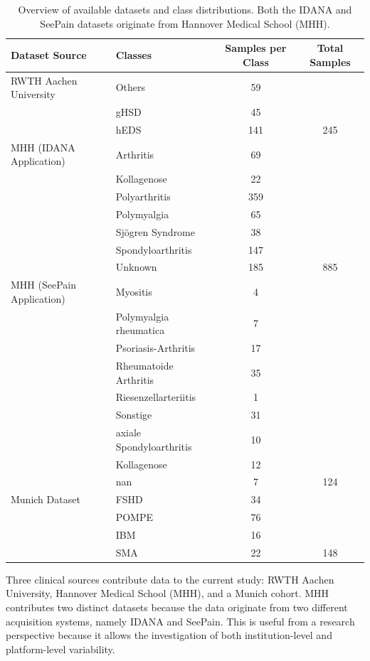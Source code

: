 \documentclass[12pt]{report}
\begin{document}
\begin{table}[h]
    \centering
    \begin{tabular}{|l|l|c|c|}
        \hline
        \textbf{Dataset Source} & \textbf{Classes} & \textbf{Samples per Class} & \textbf{Total Samples} \\
        \hline
        RWTH Aachen University & Others & 59 & \\
        & gHSD & 45 & \\
        & hEDS & 141 & 245 \\
        \hline
        MHH (IDANA Application) & Arthritis & 69 & \\
        & Kollagenose & 22 & \\
        & Polyarthritis & 359 & \\
        & Polymyalgia & 65 & \\
        & Sj\"ogren Syndrome & 38 & \\
        & Spondyloarthritis & 147 & \\
        & Unknown & 185 & 885 \\
        \hline
        MHH (SeePain Application) & Myositis & 4 & \\
        & Polymyalgia rheumatica & 7 & \\
        & Psoriasis-Arthritis & 17 & \\
        & Rheumatoide Arthritis & 35 & \\
        & Riesenzellarteriitis & 1 & \\
        & Sonstige & 31 & \\
        & axiale Spondyloarthritis & 10 & \\
        & Kollagenose & 12 & \\
        & nan & 7 & 124 \\
        \hline
        Munich Dataset & FSHD & 34 & \\
        & POMPE & 76 & \\
        & IBM & 16 & \\
        & SMA & 22 & 148 \\
        \hline
    \end{tabular}
    \caption{Overview of available datasets and class distributions. Both the IDANA and SeePain datasets originate from Hannover Medical School (MHH).}
    \label{tab:dataset_overview}
\end{table}

Three clinical sources contribute data to the current study: RWTH Aachen University, Hannover Medical School (MHH), and a Munich cohort. MHH contributes two distinct datasets because the data originate from two different acquisition systems, namely IDANA and SeePain. This is useful from a research perspective because it allows the investigation of both institution-level and platform-level variability.
\end{document}
